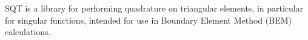 SQT is a library for performing quadrature on triangular elements, in particular for singular functions, intended for use in Boundary Element Method (BEM) calculations. 